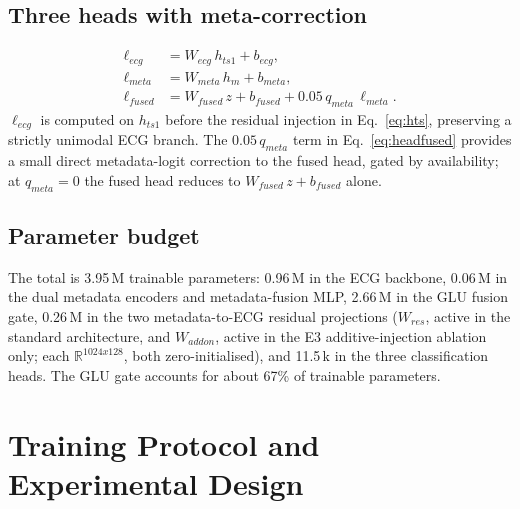 \documentclass[mathematics,article,pdftex]{Definitions/mdpi}
\def\mathrm#1{#1}%
\def\mathbf#1{#1}%
\def\emph#1{#1}%
\def\bm#1{#1}%
\def\times{x}%
\begin{document}
\subsection{Three heads with meta-correction}
\begin{align}
\bm{\ell}_{\mathrm{ecg}}   &= \mathbf{W}_{\mathrm{ecg}}\,\mathbf{h}_{\mathrm{ts1}} + \mathbf{b}_{\mathrm{ecg}}, \\
\bm{\ell}_{\mathrm{meta}}  &= \mathbf{W}_{\mathrm{meta}}\,\mathbf{h}_{\mathrm{m}} + \mathbf{b}_{\mathrm{meta}}, \\
\bm{\ell}_{\mathrm{fused}} &= \mathbf{W}_{\mathrm{fused}}\,\mathbf{z} + \mathbf{b}_{\mathrm{fused}} + 0.05\,q_{\mathrm{meta}}\,\bm{\ell}_{\mathrm{meta}}. \label{eq:headfused}
\end{align}
$\bm{\ell}_{\mathrm{ecg}}$ is computed on $\mathbf{h}_{\mathrm{ts1}}$ \emph{before} the residual injection in Eq.~\eqref{eq:hts}, preserving a strictly unimodal ECG branch. The $0.05\,q_{\mathrm{meta}}$ term in Eq.~\eqref{eq:headfused} provides a small direct metadata-logit correction to the fused head, gated by availability; at $q_{\mathrm{meta}}{=}0$ the fused head reduces to $\mathbf{W}_{\mathrm{fused}}\,\mathbf{z}+\mathbf{b}_{\mathrm{fused}}$ alone.

\subsection{Parameter budget}
The total is 3.95\,M trainable parameters: 0.96\,M in the ECG backbone, 0.06\,M in the dual metadata encoders and metadata-fusion MLP, 2.66\,M in the GLU fusion gate, 0.26\,M in the two metadata-to-ECG residual projections ($\mathbf{W}_{\mathrm{res}}$, active in the standard architecture, and $\mathbf{W}_{\mathrm{addon}}$, active in the E3 additive-injection ablation only; each $\mathbb{R}^{1024\times128}$, both zero-initialised), and 11.5\,k in the three classification heads. The GLU gate accounts for about 67\% of trainable parameters.

\section{Training Protocol and Experimental Design}\label{sec:protocol}
\end{document}
